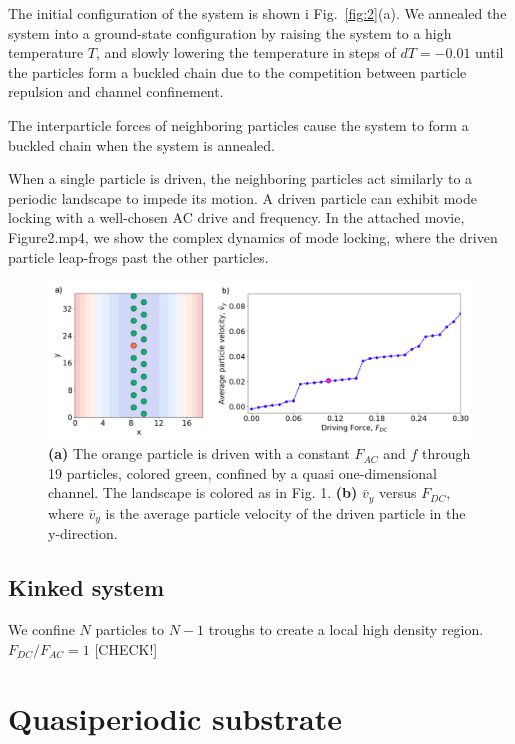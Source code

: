 \documentclass[prb,preprint]{revtex4}
\begin{document}
The initial configuration of the system is shown i
Fig.~\ref{fig:2}(a).  
We annealed the system into a ground-state configuration
by raising the system to a high temperature $T$,
and slowly lowering the temperature in steps of $dT=-0.01$
until the particles form a buckled chain due to the
competition between particle repulsion and channel confinement.

The interparticle forces of neighboring particles cause the system to form a buckled chain when the system is annealed.

When a single particle is driven, the neighboring particles act similarly to a periodic landscape to impede its motion. A driven particle can exhibit mode locking with a well-chosen AC drive and frequency. In the attached movie, Figure2.mp4, we show the complex dynamics of mode locking, where the driven particle leap-frogs past the other particles. 

\begin{center}
\begin{figure}[h!]
\centering
\includegraphics[scale=.40]{twenty}
\caption{\textbf{(a)} The orange particle is driven with a constant $F_{AC}$ and $f$ through 19 particles, colored green, confined by a quasi one-dimensional channel. The landscape is colored as in Fig. 1. \textbf{(b)} $\bar{v}_{y}$ versus $F_{DC}$, where $\bar{v}_{y}$ is the average particle velocity of the driven particle in the y-direction.}
\end{figure}
\end{center}

\subsection{Kinked system}
\label{sec:kink}	%
We confine $N$ particles to $N-1$ troughs to create a
local high density region.
$F_{DC}/F_{AC} = 1$ [CHECK!]



\section{Quasiperiodic substrate}
\label{sec:quasiperiod}	%
\end{document}
